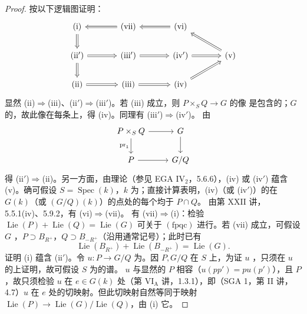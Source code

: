 \begin{proof}
按以下逻辑图证明：
\[\begin{tikzcd}[column sep=large]
\text{(i)}\arrow[d,Rightarrow]&\text{(vii)}\arrow[l,Rightarrow]&\text{(vi)}\arrow[l,Rightarrow]\\
\text{(ii$'$)}\arrow[d,Rightarrow]\arrow[r,Rightarrow]&\text{(iii$'$)}\arrow[r,Rightarrow]&\text{(iv$'$)}\arrow[r,Rightarrow]&\text{(v)}\arrow[ul,Rightarrow]\\
\text{(ii)}\arrow[r,Rightarrow]&\text{(iii)}\arrow[r,Rightarrow]&\text{(iv)}\arrow[ur,Rightarrow]
\end{tikzcd}\]
显然 (ii)$\Rightarrow$(iii)、(ii$'$)$\Rightarrow$(iii$'$)。若 (iii) 成立，则 $P\times_SQ\to G$ 的像
是包含的；$G$ 的，故此像在每条上，得 (iv)。同理有 (iii$'$)$\Rightarrow$(iv$'$)。
由
\[\begin{tikzcd}P\times_SQ\arrow[r]\arrow[d,"\operatorname{pr}_1"']&G\arrow[d]\\P\arrow[r]&G/Q\end{tikzcd}\]
得 (ii$'$)$\Rightarrow$(ii)。另一方面，由理论（参见 EGA IV$_2$，5.6.6），(iv) 或 (iv$'$) 蕴含 (v)。确可假设 $S=\operatorname{Spec}(k)$，$k$ 为；直接计算表明，(iv)（或 (iv$'$)）的在 $G(k)$（或 $(G/Q)(k)$）的点处的每个均于 $P\cap Q$。
由第 XXII 讲，5.5.1(iv)、5.9.2，有 (vi)$\Rightarrow$(vii)。
有 (vii)$\Rightarrow$(i)：检验 $\operatorname{Lie}(P)+\operatorname{Lie}(Q)=\operatorname{Lie}(G)$ 可关于 $(\mathrm{fpqc})$ 进行。若 (vii) 成立，可假设 $G$ ，$P\supset B_{R^+}$，$Q\supset B_{-R^+}$（沿用通常记号）；此时已有
\[\operatorname{Lie}(B_{R^+})+\operatorname{Lie}(B_{-R^+})=\operatorname{Lie}(G).\]
证明 (i) 蕴含 (ii$'$)。令 $u:P\to G/Q$ 为。因 $P,G/Q$ 在 $S$ 上，为证 $u$ ，只须在 $u$ 的上证明，故可假设 $S$ 为的谱。 $u$ 与显然的 $P$ 相容（$u(pp')=pu(p')$），且 $P$ ，故只须检验 $u$ 在 $e\in G(k)$ 处（第 VI$_{\mathrm A}$ 讲，1.3.1），即（SGA 1，第 II 讲，4.7）$u$ 在 $e$ 处的切映射。但此切映射自然等同于映射 $\operatorname{Lie}(P)\to\operatorname{Lie}(G)/\operatorname{Lie}(Q)$，由 (i) 它。

\end{proof}
